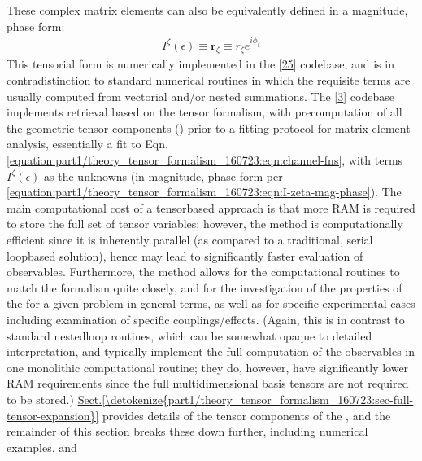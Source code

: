 \documentclass[letterpaper,table,10pt,english]{jupyterBook}
\begin{document}
\sphinxAtStartPar
These complex matrix elements can also be equivalently defined in a magnitude, phase
form:
\begin{equation}\label{equation:part1/theory_tensor_formalism_160723:eqn:I-zeta-mag-phase}
\begin{split}I^{\zeta}(\epsilon)\equiv\mathbf{r}_{\zeta}\equiv r_{\zeta}e^{i\phi_{\zeta}}\end{split}
\end{equation}
\sphinxAtStartPar
This tensorial form is numerically implemented in the  {[}\hyperlink{cite.backmatter/bibliography:id597}{25}{]} codebase, and is in contradistinction to standard numerical routines in which the requisite terms are usually computed from vectorial and/or nested summations. The  {[}\hyperlink{cite.backmatter/bibliography:id668}{3}{]} codebase implements {\hyperref[\detokenize{backmatter/glossary:term-radial-matrix-elements}]{}} retrieval based on the tensor formalism, with pre\sphinxhyphen{}computation of all the geometric tensor components ({\hyperref[\detokenize{backmatter/glossary:term-channel-functions}]{}}) prior to a fitting protocol for matrix element analysis, essentially a fit to Eqn. \eqref{equation:part1/theory_tensor_formalism_160723:eqn:channel-fns}, with terms \(I^{\zeta}(\epsilon)\) as the unknowns (in magnitude, phase form per \eqref{equation:part1/theory_tensor_formalism_160723:eqn:I-zeta-mag-phase}). The main computational cost of a tensor\sphinxhyphen{}based approach is that more RAM is required to store the full set of tensor variables; however, the method is computationally efficient since it is inherently parallel (as compared to a traditional, serial loop\sphinxhyphen{}based solution), hence may lead to significantly faster evaluation of observables. Furthermore, the method allows for the computational routines to match the formalism quite closely, and for the investigation of the properties of the {\hyperref[\detokenize{backmatter/glossary:term-channel-functions}]{}} for a given problem in general terms, as well as for specific experimental cases including examination of specific couplings/effects. (Again, this is in contrast to standard nested\sphinxhyphen{}loop routines, which can be somewhat opaque to detailed interpretation, and typically implement the full computation of the observables in one monolithic computational routine; they do, however, have significantly lower RAM requirements since the full multi\sphinxhyphen{}dimensional basis tensors are not required to be stored.) \hyperref[\detokenize{part1/theory_tensor_formalism_160723:sec-full-tensor-expansion}]{Sect.\@ \ref{\detokenize{part1/theory_tensor_formalism_160723:sec-full-tensor-expansion}}} provides details of the tensor components of the {\hyperref[\detokenize{backmatter/glossary:term-channel-functions}]{}}, and the remainder of this section breaks these down further, including numerical examples, and 
\end{document}
